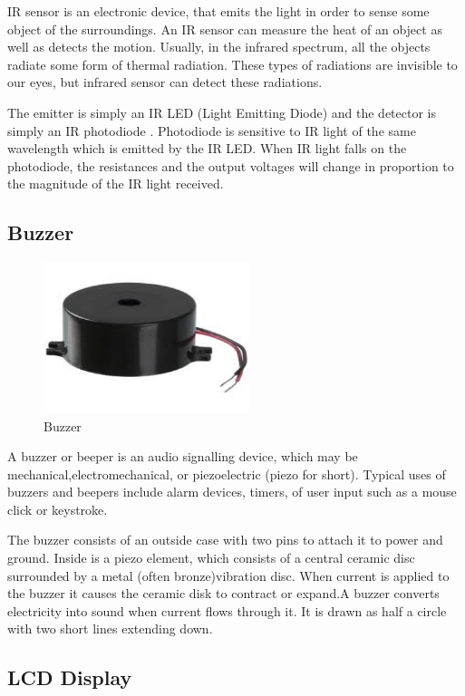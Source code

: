  IR sensor is an electronic device, that emits the light in order to sense some object of the surroundings. An IR sensor can measure the heat of an object as well as detects the motion. Usually, in the infrared spectrum, all the objects radiate some form of thermal radiation. These types of radiations are invisible to our eyes, but infrared sensor can detect these radiations.
 
  The emitter is simply an IR LED (Light Emitting Diode) and the detector is simply an IR photodiode . Photodiode is sensitive to IR light of the same wavelength which is emitted by the IR LED. When IR light falls on the photodiode, the resistances and the output voltages will change in proportion to the magnitude of the IR light received.
 
\newpage 
\subsection{Buzzer}

	\begin{figure}[h]
		\centering
	\includegraphics[width=60mm,scale=1]{45}
	\caption{Buzzer}
	\label{Buzzer}
	
\end{figure}

 A buzzer or beeper is an audio signalling device, which may be mechanical,electromechanical, or piezoelectric (piezo for short). Typical uses of buzzers and beepers include alarm devices, timers, of user input such as a mouse click or keystroke.
 
 The buzzer consists of an outside case with two pins to attach it to power and ground. Inside is a piezo element, which consists of a central ceramic disc surrounded by a metal (often bronze)vibration disc. When current is applied to the buzzer it causes the ceramic disk to contract or expand.A buzzer converts
electricity into sound when current flows through it. It is drawn as half a circle with two short lines extending down.  
 
\newpage

\subsection{LCD Display}

